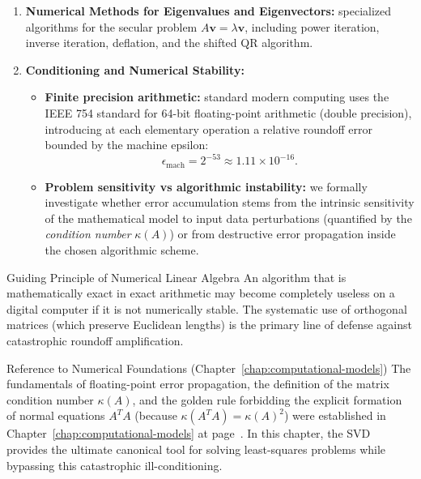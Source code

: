 \begin{enumerate}
    \item \textbf{Numerical Methods for Eigenvalues and Eigenvectors:} specialized algorithms for the secular problem $A\mathbf{v} = \lambda \mathbf{v}$, including power iteration, inverse iteration, deflation, and the shifted QR algorithm.

    \item \textbf{Conditioning and Numerical Stability:}
    \begin{itemize}
        \item \textbf{Finite precision arithmetic:} standard modern computing uses the IEEE 754 standard for 64-bit floating-point arithmetic (double precision), introducing at each elementary operation a relative roundoff error bounded by the machine epsilon:
        \begin{equation}
            \epsilon_{\text{mach}} = 2^{-53} \approx 1.11 \times 10^{-16}.
        \end{equation}
        \item \textbf{Problem sensitivity vs algorithmic instability:} we formally investigate whether error accumulation stems from the intrinsic sensitivity of the mathematical model to input data perturbations (quantified by the \textit{condition number} $\kappa(A)$) or from destructive error propagation inside the chosen algorithmic scheme.
    \end{itemize}
\end{enumerate}

\begin{alertblock}{Guiding Principle of Numerical Linear Algebra}
An algorithm that is mathematically exact in exact arithmetic may become completely useless on a digital computer if it is not numerically stable. The systematic use of orthogonal matrices (which preserve Euclidean lengths) is the primary line of defense against catastrophic roundoff amplification.
\end{alertblock}

\begin{noteblock}{Reference to Numerical Foundations (Chapter~\ref{chap:computational-models})}
The fundamentals of floating-point error propagation, the definition of the matrix condition number $\kappa(A)$, and the golden rule forbidding the explicit formation of normal equations $A^T A$ (because $\kappa(A^T A) = \kappa(A)^2$) were established in Chapter~\ref{chap:computational-models} at page~\pageref{rem:en:golden-rule-normal-equations}. In this chapter, the SVD provides the ultimate canonical tool for solving least-squares problems while bypassing this catastrophic ill-conditioning.
\end{noteblock}

